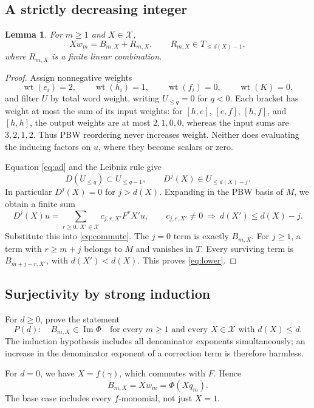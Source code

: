 \documentclass[11pt]{article}
\newcommand{\im}{\operatorname{Im}}
\newcommand{\wt}{\operatorname{wt}}
\newtheorem{lemma}[theorem]{Lemma}
\begin{document}
\subsection{A strictly decreasing integer}

\begin{lemma}\label{lem:lower}
For \(m\ge1\) and \(X\in\mathcal X\),
\begin{equation}\label{eq:lower}
 Xw_m=B_{m,X}+R_{m,X},\qquad R_{m,X}\in T_{\le d(X)-1},
\end{equation}
where \(R_{m,X}\) is a finite linear combination.
\end{lemma}

\begin{proof}
Assign nonnegative weights
\[
 \wt(e_i)=2,\qquad \wt(h_i)=1,\qquad \wt(f_i)=0,\qquad \wt(K)=0,
\]
and filter \(U\) by total word weight, writing \(U_{\le q}=0\) for \(q<0\).
Each bracket has weight at most the sum of its input weights:
for \([h,e]\), \([e,f]\), \([h,f]\), and \([h,h]\), the output weights
are at most \(2,1,0,0\), whereas the input sums are \(3,2,1,2\).
Thus PBW reordering never increases weight. Neither does evaluating
the inducing factors on \(u\), where they become scalars or zero.

Equation \eqref{eq:ad} and the Leibniz rule give
\[
 D(U_{\le q})\subset U_{\le q-1},\qquad
 D^j(X)\in U_{\le d(X)-j}.
\]
In particular \(D^j(X)=0\) for \(j>d(X)\). Expanding in the PBW basis of \(M\),
we obtain a finite sum
\[
 D^j(X)u=\sum_{r\ge0,\,X'\in\mathcal X}c_{j,r,X'}F^rX'u,\qquad
 c_{j,r,X'}\ne0\ \Longrightarrow\ d(X')\le d(X)-j.
\]
Substitute this into \eqref{eq:commute}. The \(j=0\) term is exactly \(B_{m,X}\).
For \(j\ge1\), a term with \(r\ge m+j\) belongs to \(M\) and vanishes in \(T\).
Every surviving term is \(B_{m+j-r,X'}\), with \(d(X')<d(X)\).
This proves \eqref{eq:lower}.
\end{proof}

\subsection{Surjectivity by strong induction}

For \(d\ge0\), prove the statement
\[
 P(d):\quad B_{m,X}\in\im\Phi
 \quad\text{for every }m\ge1\text{ and every }X\in\mathcal X
 \text{ with }d(X)\le d.
\]
The induction hypothesis includes all denominator exponents simultaneously;
an increase in the denominator exponent of a correction term is therefore harmless.

For \(d=0\), we have \(X=f(\gamma)\), which commutes with \(F\). Hence
\[
 B_{m,X}=Xw_m=\Phi(Xq_m).
\]
The base case includes every \(f\)-monomial, not just \(X=1\).
\end{document}
